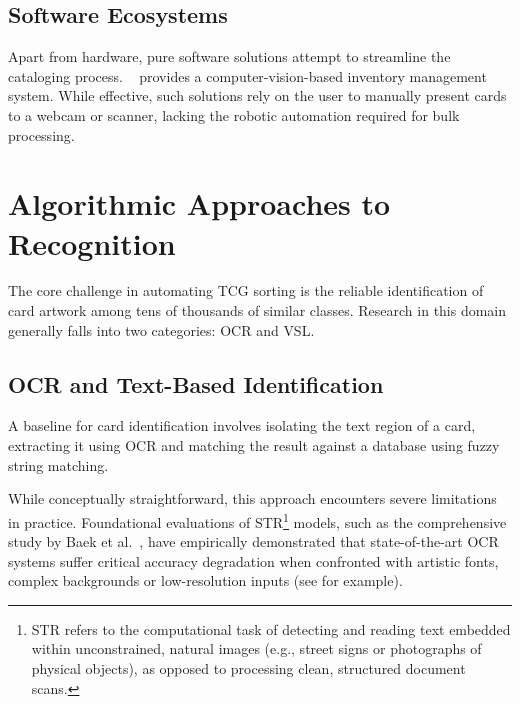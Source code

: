 \subsection{Software Ecosystems}
Apart from hardware, pure software solutions attempt to streamline the cataloging process. ~\cite{carddealerpro} provides a computer-vision-based inventory management system. While effective, such solutions rely on the user to manually present cards to a webcam or scanner, lacking the robotic automation required for bulk processing.

\section{Algorithmic Approaches to Recognition}
The core challenge in automating \ac{TCG} sorting is the reliable identification of card artwork among tens of thousands of similar classes. Research in this domain generally falls into two categories: \ac{OCR} and \ac{VSL}.

\subsection{OCR and Text-Based Identification}\label{subsec:ocr_limitations}
A baseline for card identification involves isolating the text region of a card, extracting it using \ac{OCR} and matching the result against a database using fuzzy string matching.

While conceptually straightforward, this approach encounters severe limitations in practice. Foundational evaluations of \ac{STR}\footnote{\ac{STR} refers to the computational task of detecting and reading text embedded within unconstrained, natural images (e.g., street signs or photographs of physical objects), as opposed to processing clean, structured document scans.} models, such as the comprehensive study by Baek et al.~\cite{baek2019wrong}, have empirically demonstrated that state-of-the-art \ac{OCR} systems suffer critical accuracy degradation when confronted with artistic fonts, complex backgrounds or low-resolution inputs (see  for example).

